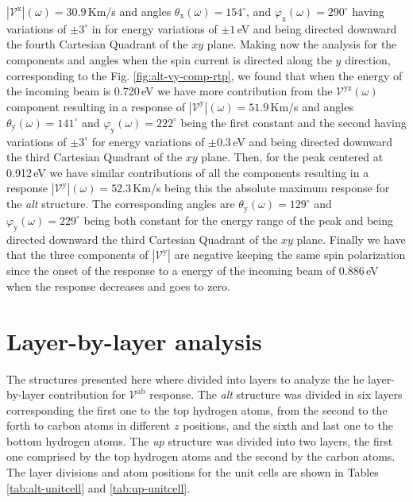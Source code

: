 \documentclass[prb,11pt,tightenlines,twocolumn,aps]{revtex4-1}
\begin{document}
$|\mathcal{V}^{\mathrm{x}}|(\omega)=30.9$\,Km/s and angles
$\theta_{\mathrm{x}}(\omega)=154^{\circ}$, and
$\varphi_{\mathrm{x}}(\omega)=290^{\circ}$ having variations of $\pm3^{\circ}$
in for energy variations of $\pm1$\,eV and being directed downward the fourth
Cartesian Quadrant of the $xy$ plane.
% 
Making now the analysis for the components and angles when the spin current is
directed along the $y$ direction, corresponding to the Fig.
% 
\ref{fig:alt-vy-comp-rtp}, we found that when the energy of the incoming beam is
0.720\,eV we have more contribution from the $\mathcal{V}^{\mathrm{yz}}(\omega)$
component resulting in a response of
$|\mathcal{V}^{\mathrm{y}}|(\omega)=51.9$\,Km/s and angles
$\theta_{\mathrm{y}}(\omega)=141^{\circ}$ and
$\varphi_{\mathrm{y}}(\omega)=222^{\circ}$ being the first constant and the
second having variations of $\pm3^{\circ}$ for energy variations of $\pm0.3$\,eV
and being directed downward the third Cartesian Quadrant of the $xy$ plane.
% 
Then, for the peak centered at 0.912\,eV we have similar contributions of all
the components resulting in a response
$|\mathcal{V}^{\mathrm{y}}|(\omega)=52.3$\,Km/s being this the absolute maximum
response for the \emph{alt} structure. The corresponding angles are
$\theta_{\mathrm{y}}(\omega)=129^{\circ}$ and
$\varphi_{\mathrm{y}}(\omega)=229^{\circ}$ being both constant for the energy
range of the peak and being directed downward the third Cartesian Quadrant of
the $xy$ plane.
% 
Finally we have that the three components of $|\mathcal{V}^{\mathrm{y}}|$ are
negative keeping the same spin polarization since the onset of the response to a
energy of the incoming beam of 0.886\,eV when the response decreases and goes to
zero.


\section{Layer-by-layer analysis} %
\label{sec:res-layer_by_layer_analysis}

The structures presented here where divided into layers to analyze the he
layer-by-layer contribution for $\mathcal{V}^{\mathrm{ab}}$ response. The
\emph{alt} structure was divided in six layers corresponding the first one to
the top hydrogen atoms, from the second to the forth to carbon atoms in
different $z$ positions, and the sixth and last one to the bottom hydrogen
atoms. The \emph{up} structure was divided into two layers, the first one
comprised by the top hydrogen atoms and the second by the carbon atoms. The
layer divisions and atom positions for the unit cells are shown in Tables
\ref{tab:alt-unitcell} and \ref{tab:up-unitcell}.
\end{document}
